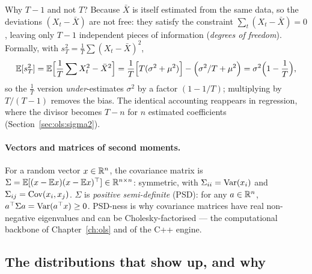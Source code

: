 Why $T-1$ and not $T$? Because $\bar X$ is itself estimated from the same data, so the
deviations $(X_t-\bar X)$ are not free: they satisfy the constraint
$\sum_t (X_t-\bar X)=0$, leaving only $T-1$ independent pieces of information
(\emph{degrees of freedom}). Formally, with $s^2_T = \frac{1}{T}\sum (X_t-\bar X)^2$,
\[
  \mathbb{E}[s_T^2] = \mathbb{E}\Bigl[\frac{1}{T}\sum X_t^2 - \bar X^2\Bigr]
  = \frac{1}{T}\Bigl[T(\sigma^2+\mu^2)\Bigr] - \Bigl(\sigma^2/T + \mu^2\Bigr)
  = \sigma^2\Bigl(1-\frac{1}{T}\Bigr),
\]
so the $\frac{1}{T}$ version \emph{under}-estimates $\sigma^2$ by a factor
$(1-1/T)$; multiplying by $T/(T-1)$ removes the bias. The identical accounting
reappears in regression, where the divisor becomes $T-n$ for $n$ estimated
coefficients (Section~\ref{sec:ols:sigma2}).

\paragraph{Vectors and matrices of second moments.} For a random vector
$x\in\mathbb{R}^{n}$, the covariance matrix is $\Sigma=\mathbb{E}[(x-\mathbb{E} x)(x-\mathbb{E} x)^{\top}]\in\mathbb{R}^{n\times n}$:
symmetric, with $\Sigma_{ii}=\operatorname{Var}(x_i)$ and $\Sigma_{ij}=\operatorname{Cov}(x_i,x_j)$.
$\Sigma$ is \emph{positive semi-definite} (PSD): for any $a\in\mathbb{R}^n$,
$a^{\top}\Sigma a = \operatorname{Var}(a^{\top}x)\ge 0$. PSD-ness is why covariance matrices have
real non-negative eigenvalues and can be Cholesky-factorised --- the computational
backbone of Chapter~\ref{ch:ols} and of the C++ engine.

\subsection{The distributions that show up, and why}
\label{sec:prob:distributions}

